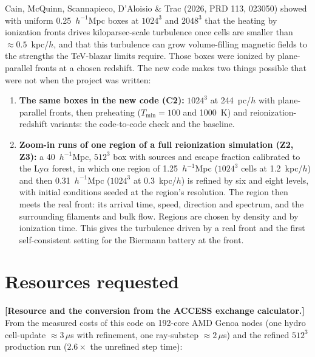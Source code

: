 \documentclass[11pt]{article}
\newcommand{\todo}[1]{\textbf{[#1]}}
\begin{document}
Cain, McQuinn, Scannapieco, D'Aloisio \& Trac (2026, PRD 113, 023050) showed
with uniform 0.25~$h^{-1}$Mpc boxes at $1024^3$ and $2048^3$ that the heating
by ionization fronts drives kiloparsec-scale turbulence once cells are smaller
than $\approx 0.5$~kpc/$h$, and that this turbulence can grow volume-filling
magnetic fields to the strengths the TeV-blazar limits require. Those boxes
were ionized by plane-parallel fronts at a chosen redshift. The new code makes
two things possible that were not when the project was written:
\begin{enumerate}
\item \textbf{The same boxes in the new code (C2):} $1024^3$ at 244~pc/$h$ with
  plane-parallel fronts, then preheating ($T_{\min} = 100$ and 1000~K) and
  reionization-redshift variants: the code-to-code check and the baseline.
\item \textbf{Zoom-in runs of one region of a full reionization simulation
  (Z2, Z3):} a 40~$h^{-1}$Mpc, $512^3$ box with sources and escape fraction
  calibrated to the Ly$\alpha$ forest, in which one region of
  1.25~$h^{-1}$Mpc ($1024^3$ cells at 1.2~kpc/$h$) and then 0.31~$h^{-1}$Mpc
  ($1024^3$ at 0.3~kpc/$h$) is refined by six and eight levels, with initial
  conditions seeded at the region's resolution. The region then meets the real
  front: its arrival time, speed, direction and spectrum, and the surrounding
  filaments and bulk flow. Regions are chosen by density and by ionization
  time. This gives the turbulence driven by a real front and the first
  self-consistent setting for the Biermann battery at the front.
\end{enumerate}

\section{Resources requested}

\todo{Resource and the conversion from the ACCESS exchange calculator.} From
the measured costs of this code on 192-core AMD Genoa nodes (one hydro
cell-update $\approx 3\,\mu$s with refinement, one ray-substep
$\approx 2\,\mu$s) and the refined $512^3$ production run ($2.6\times$ the
unrefined step time):
\end{document}
